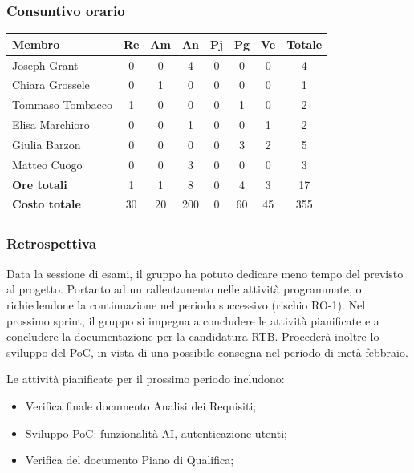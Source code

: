 \documentclass[11pt,a4paper]{article}
\begin{document}
\subsubsection{Consuntivo orario}
\begin{center}
    \begin{tabular}{|l|c|c|c|c|c|c|c|}
        \hline
        \textbf{Membro} & \textbf{Re} & \textbf{Am} & \textbf{An} & \textbf{Pj} & \textbf{Pg} & \textbf{Ve} & \textbf{Totale} \\
        \hline
        Joseph Grant & 0 & 0 & 4 & 0 & 0 & 0 & 4 \\
        \hline
        Chiara Grossele & 0 & 1 & 0 & 0 & 0 & 0 & 1 \\
        \hline
        Tommaso Tombacco & 1 & 0 & 0 & 0 & 1 & 0 & 2 \\
        \hline
        Elisa Marchioro & 0 & 0 & 1 & 0 & 0 & 1 & 2 \\
        \hline
        Giulia Barzon & 0 & 0 & 0 & 0 & 3 & 2 & 5 \\
        \hline
        Matteo Cuogo & 0 & 0 & 3 & 0 & 0 & 0 & 3 \\
        \hline
        \textbf{Ore totali} & 1 & 1 & 8 & 0 & 4 & 3 & 17 \\
        \hline
        \textbf{Costo totale} & 30 & 20 & 200 & 0 & 60 & 45 & 355 \\
        \hline
    \end{tabular}
\end{center}

\subsubsection{Retrospettiva}
Data la sessione di esami, il gruppo ha potuto dedicare meno tempo del previsto al progetto. Portanto ad un rallentamento nelle attività programmate, o richiedendone la continuazione nel periodo successivo (rischio RO-1). 
Nel prossimo sprint, il gruppo si impegna a concludere le attività pianificate e a concludere la documentazione per la candidatura RTB. Procederà inoltre lo sviluppo del PoC, in vista di una possibile consegna nel periodo di metà febbraio.

Le attività pianificate per il prossimo periodo includono:
\begin{itemize}
    \item Verifica finale documento Analisi dei Requisiti;
    \item Sviluppo PoC: funzionalità AI, autenticazione utenti;
    \item Verifica del documento Piano di Qualifica;
\end{itemize}
\end{document}
